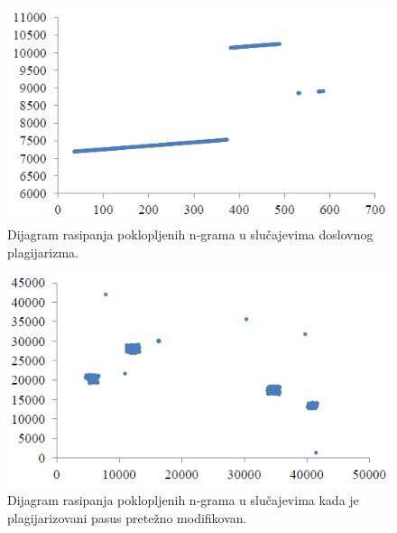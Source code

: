 \documentclass[a4paper]{article}
\begin{document}
\begin{figure}[h!]
\begin{center}
\includegraphics[natwidth=450, natheight=250, scale=0.3]{slika1.PNG}
\end{center}
\caption{Dijagram rasipanja poklopljenih n-grama u slučajevima doslovnog plagijarizma.}
\label{fig:slika1}
\end{figure}

\begin{figure}[h!]
\begin{center}
\includegraphics[natwidth=450, natheight=250, scale=0.3]{slika2.PNG}
\end{center}
\caption{Dijagram rasipanja poklopljenih n-grama u slučajevima kada je plagijarizovani pasus pretežno modifikovan.}
\label{fig:slika2}
\end{figure}
\end{document}
